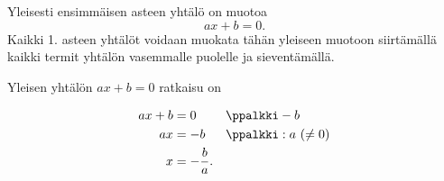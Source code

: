 Yleisesti ensimmäisen asteen yhtälö on muotoa
\[
    ax + b = 0.
\]
Kaikki 1. asteen yhtälöt voidaan muokata tähän yleiseen muotoon siirtämällä kaikki termit yhtälön vasemmalle puolelle ja sieventämällä.

Yleisen yhtälön $ax + b = 0$ ratkaisu on

\begin{align*}
	 ax + b &= 0  && \ppalkki -b\\
	 ax &= -b  && \ppalkki : a \ (\neq 0)\\
  x &= -\frac{b}{a}.
\end{align*}

